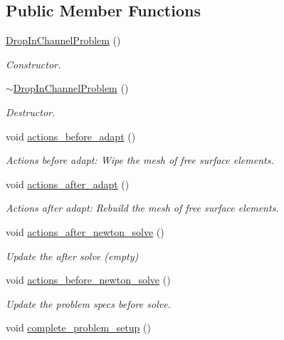 \subsection*{Public Member Functions}
\begin{DoxyCompactItemize}
\item 
\hyperlink{classDropInChannelProblem_aad6e79f5560a5bfcba325f6558afb4ff}{Drop\+In\+Channel\+Problem} ()
\begin{DoxyCompactList}\small\item\em Constructor. \end{DoxyCompactList}\item 
\hyperlink{classDropInChannelProblem_aa311cd8061b915901c8c74617d2e4a37}{$\sim$\+Drop\+In\+Channel\+Problem} ()
\begin{DoxyCompactList}\small\item\em Destructor. \end{DoxyCompactList}\item 
void \hyperlink{classDropInChannelProblem_a4d4ae7fdef14f9838a46cc45278c7920}{actions\+\_\+before\+\_\+adapt} ()
\begin{DoxyCompactList}\small\item\em Actions before adapt\+: Wipe the mesh of free surface elements. \end{DoxyCompactList}\item 
void \hyperlink{classDropInChannelProblem_af5cc96bc60c2fd2386d16eac3ee5f83a}{actions\+\_\+after\+\_\+adapt} ()
\begin{DoxyCompactList}\small\item\em Actions after adapt\+: Rebuild the mesh of free surface elements. \end{DoxyCompactList}\item 
void \hyperlink{classDropInChannelProblem_ab38a14018a4093afe7cc0d9db9f1fc3b}{actions\+\_\+after\+\_\+newton\+\_\+solve} ()
\begin{DoxyCompactList}\small\item\em Update the after solve (empty) \end{DoxyCompactList}\item 
void \hyperlink{classDropInChannelProblem_a0e229343783fd73768dfa0a2672e9ad1}{actions\+\_\+before\+\_\+newton\+\_\+solve} ()
\begin{DoxyCompactList}\small\item\em Update the problem specs before solve. \end{DoxyCompactList}\item 
void \hyperlink{classDropInChannelProblem_a3a868202b34b195a78298b4eaf7d3aff}{complete\+\_\+problem\+\_\+setup} ()

\end{DoxyCompactItemize}
